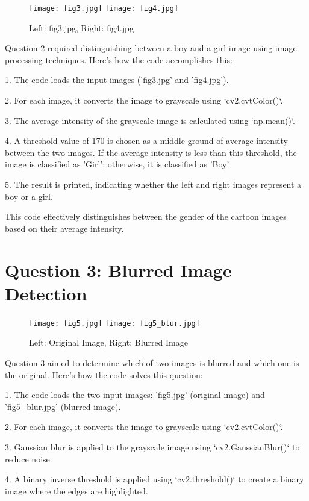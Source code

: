 \documentclass{article}
\begin{document}
\begin{figure}[ht]
    \centering
    \texttt{[image: fig3.jpg]}
    \texttt{[image: fig4.jpg]}
    \caption{Left: fig3.jpg, Right: fig4.jpg}
\end{figure}

Question 2 required distinguishing between a boy and a girl image using image processing techniques. Here's how the code accomplishes this:

1. The code loads the input images ('fig3.jpg' and 'fig4.jpg').

2. For each image, it converts the image to grayscale using `cv2.cvtColor()`.

3. The average intensity of the grayscale image is calculated using `np.mean()`.

4. A threshold value of 170 is chosen as a middle ground of average intensity between the two images. If the average intensity is less than this threshold, the image is classified as 'Girl'; otherwise, it is classified as 'Boy'.

5. The result is printed, indicating whether the left and right images represent a boy or a girl.

This code effectively distinguishes between the gender of the cartoon images based on their average intensity.

\section{Question 3: Blurred Image Detection}

\begin{figure}[ht]
    \centering
    \texttt{[image: fig5.jpg]}
    \texttt{[image: fig5\_blur.jpg]}
    \caption{Left: Original Image, Right: Blurred Image}
\end{figure}

Question 3 aimed to determine which of two images is blurred and which one is the original. Here's how the code solves this question:

1. The code loads the two input images: 'fig5.jpg' (original image) and 'fig5\_blur.jpg' (blurred image).

2. For each image, it converts the image to grayscale using `cv2.cvtColor()`.

3. Gaussian blur is applied to the grayscale image using `cv2.GaussianBlur()` to reduce noise.

4. A binary inverse threshold is applied using `cv2.threshold()` to create a binary image where the edges are highlighted.
\end{document}
